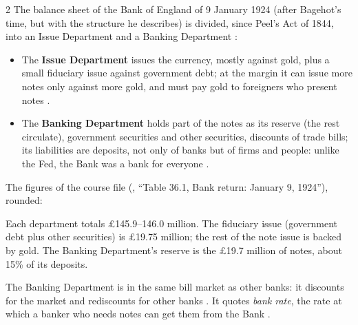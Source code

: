 \begin{paracol}{2}
The balance sheet of the Bank of England of 9 January 1924 (after Bagehot's time, but with the structure he describes) is divided, since Peel's Act of 1844, into an Issue
Department and a Banking Department :
\begin{taccts}
\qquad
{}
\end{taccts}
\begin{itemize}
  \item The \textbf{Issue Department} issues the currency, mostly against gold, plus a small fiduciary issue against government debt; at the margin it can issue more notes only
        against more gold, and must pay gold to foreigners who present notes .
  \item The \textbf{Banking Department} holds part of the notes as its reserve (the rest circulate), government securities and other securities, discounts of trade bills; its
        liabilities are deposits, not only of banks but of firms and people: unlike the Fed, the Bank was a bank for everyone .
\end{itemize}
\begin{reading}
The figures of the course file (, ``Table 36.1, Bank return: January 9, 1924''), rounded:
\begin{taccts}
\qquad
{}
\end{taccts}
Each department totals \pounds145.9--146.0 million. The fiduciary issue (government debt plus other securities) is \pounds19.75 million; the rest of the note issue is backed by gold. The Banking Department's reserve is the \pounds19.7 million of notes, about 15\% of its deposits.
\end{reading}
The Banking Department is in the same bill market as other banks: it discounts for the market and rediscounts for other banks . It quotes \emph{bank rate},
the rate at which a banker who needs notes can get them from the Bank .


\end{paracol}

